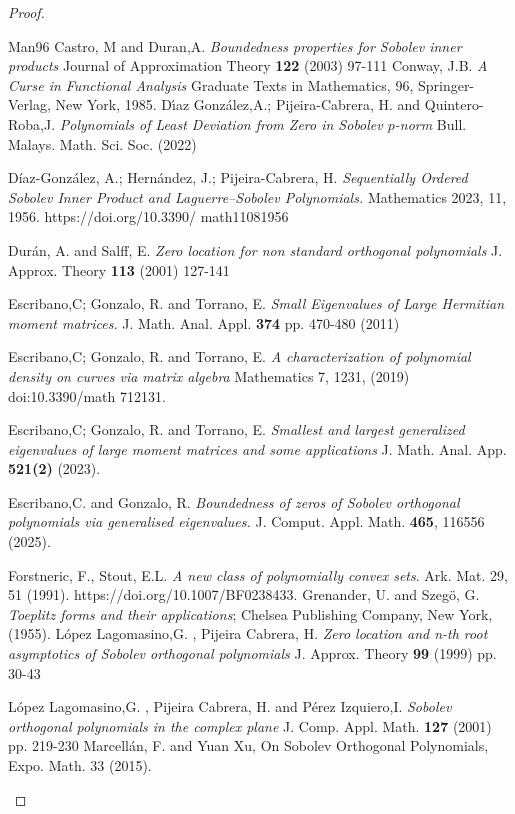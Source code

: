 \documentclass[12pt]{amsart}
\theoremstyle{definition}
\theoremstyle{plain}
\theoremstyle{remark}
\begin{document}
\begin{proof}
\begin{thebibliography}{Man96}
 Castro, M and Duran,A. \emph{Boundedness properties for Sobolev inner products} Journal of Approximation Theory {\bf 122} (2003) 97-111
 Conway, J.B. \emph{A Curse in Functional Analysis}
       Graduate Texts in Mathematics, 96, Springer-Verlag, New York, 1985.
 D\'{\i}az Gonz\'{a}lez,A.; Pijeira-Cabrera, H. and Quintero-Roba,J. \emph{Polynomials of Least Deviation from Zero in Sobolev $p$-norm} Bull. Malays. Math. Sci. Soc.  (2022) 


 Díaz-González, A.;
Hernández, J.; Pijeira-Cabrera, H.
\emph{ Sequentially Ordered Sobolev Inner
Product and Laguerre–Sobolev
Polynomials.} Mathematics 2023, 11,
1956. https://doi.org/10.3390/
math11081956




 Dur\'{a}n, A. and Salff, E. \emph{Zero location for non standard orthogonal polynomials } J. Approx. Theory {\bf 113} (2001) 127-141 



 Escribano,C; Gonzalo, R. and Torrano, E. \emph{ Small Eigenvalues of Large Hermitian
moment matrices.} J. Math. Anal. Appl. {\bf 374}  pp. 470-480 (2011)

 Escribano,C; Gonzalo, R. and Torrano, E. \emph{ A characterization of polynomial density on curves via matrix algebra} Mathematics 7, 1231,  (2019) doi:10.3390/math 712131.
 
  Escribano,C; Gonzalo, R. and Torrano, E.  \emph{Smallest and largest generalized eigenvalues of large moment matrices and some applications} J. Math. Anal. App. {\bf 521(2)} (2023).

 Escribano,C. and  Gonzalo, R. \emph{Boundedness of zeros of Sobolev orthogonal polynomials via generalised eigenvalues.} J. Comput. Appl. Math. \textbf{465}, 116556 (2025). 

 Forstneric, F., Stout, E.L. \emph{A new class of polynomially convex sets}. Ark. Mat. 29, 51 (1991).
https://doi.org/10.1007/BF0238433.
 Grenander, U. and Szegö, G. \emph{Toeplitz forms and their applications}; Chelsea Publishing Company, New York, (1955). 
 L\'{o}pez Lagomasino,G. , Pijeira Cabrera, H. \emph{Zero location and n-th root asymptotics of Sobolev orthogonal polynomials} J. Approx. Theory {\bf 99} (1999) pp. 30-43


 L\'{o}pez Lagomasino,G. , Pijeira Cabrera, H. and P\'{e}rez Izquiero,I. \emph{Sobolev orthogonal polynomials in the complex plane} J. Comp. Appl. Math. {\bf 127} (2001) pp. 
 219-230
 Marcell\'an, F. and Yuan Xu, On Sobolev Orthogonal Polynomials, Expo. Math. 33 (2015).


\end{thebibliography}
\end{proof}
\end{document}
